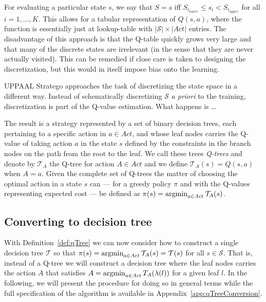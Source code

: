 For evaluating a particular state $s$, we say that $S = s$ iff $S_{i_{lower}}
\le s_i < S_{i_{upper}}$ for all $i = 1, \ldots, K$.  This allows for a tabular
representation of $Q(s,a)$, where the function is essentially just at
lookup-table with $|\mathcal{S}| \times |Act|$ entries. The disadvantage
of this approach is that the Q-table quickly grows very large and that many of
the discrete states are irrelevant (in the sense that they are never actually
visited). This can be remedied if close care is taken to designing the
discretization, but this would in itself impose bias onto the learning.

UPPAAL Stratego approaches the task of discretizing the state space in a
different way. Instead of schematically discretizing $\mathcal{S}$ \textit{a
priori} to the training, discretization is part of the Q-value estimation. What
happens is \ldots{}

The result is a strategy represented by a set of binary decision trees, each
pertaining to a specific action in $a \in Act$, and whose leaf nodes carries the
Q-value of taking action $a$ in the state $s$ defined by the constraints in the
branch nodes on the path from the root to the leaf. We call these trees
\textit{Q-trees} and denote by $\mathcal{T}_A$ the Q-tree for action $A \in Act$
and we define $\mathcal{T}_A(s) = Q(s,a)$ when $A=a$. Given the complete set of Q-trees
the matter of choosing the optimal action in a state $s$ can --- for a greedy
policy $\pi$ and with the Q-values representing expected cost --- be defined as
$\pi(s) = \operatorname*{argmin}_{a\in Act} \mathcal{T}_A(s)$.


\subsection{Converting to decision tree}%
\label{subsec:convertQTtoDT}

With Definition~\ref{def:qTree} we can now consider how to construct a single
decision tree $\mathcal{T}$ so that $\pi(s) = \operatorname*{argmin}_{a \in Act}
\mathcal{T}_A(s) = \mathcal{T}(s)$ for all $s \in \mathcal{S}$. That is, instead
of a Q-tree we will construct a decision tree where the leaf nodes carries the
action $A$ that satisfies $A = \operatorname*{argmin}_{a \in Act} T_A(\lambda(l))$ for
a given leaf $l$. In the following, we will present the procedure for doing so
in general terms while the full specification of the algorithm is available in
Appendix~\ref{app:qTreeConversion}.

